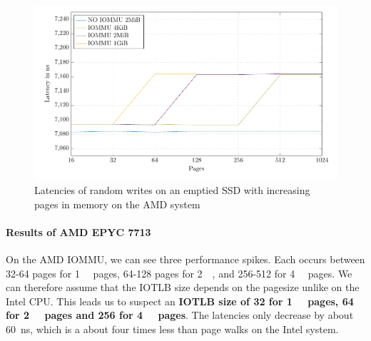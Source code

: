 \begin{figure}[H]
  \centering
  \includegraphics[width=\textwidth]{figures/psmedsepyc}
  \caption{Latencies of random writes on an emptied SSD with increasing pages in memory on the AMD system}
  \label{fig:med-psepyc}
\end{figure}

\paragraph{Results of AMD EPYC 7713}
On the AMD IOMMU, we can see three performance spikes. Each occurs between 32-64 pages for \qty{1}{\gibi\byte} pages, 64-128 pages for \qty{2}{\mebi\byte}, and 256-512 for \qty{4}{\kibi\byte} pages.
We can therefore assume that the IOTLB size depends on the pagesize unlike on the Intel CPU. This leads us to suspect an \textbf{IOTLB size of 32 for \qty{1}{\gibi\byte} pages, 64 for \qty{2}{\mebi\byte} pages and 256 for \qty{4}{\kibi\byte} pages}. The latencies only decrease by about \qty{60}{ns}, which is a about four times less than page walks on the Intel system.